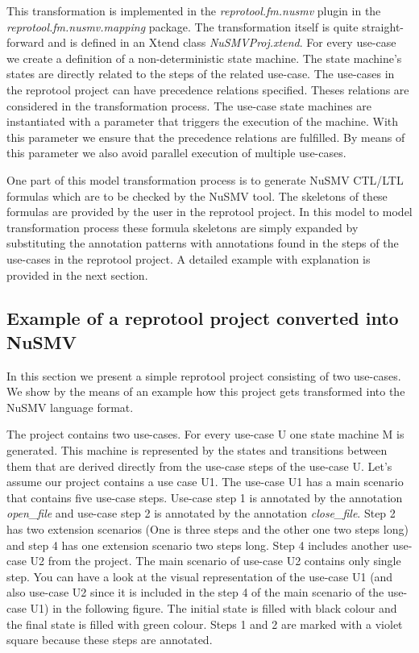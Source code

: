 This transformation is implemented in the \emph{reprotool.fm.nusmv} plugin in the \emph{reprotool.fm.nusmv.mapping} package.
The transformation itself is quite straight-forward and is defined in an Xtend class \emph{NuSMVProj.xtend}.
For every use-case we create a definition of a non-deterministic state machine.
The state machine's states are directly related to the steps of the related use-case.
The use-cases in the reprotool project can have precedence relations specified. Theses relations are considered in the
transformation process. The use-case state machines are instantiated with a parameter that triggers the execution of the machine.
With this parameter we ensure that the precedence relations are fulfilled. By means of this parameter we also avoid parallel execution
of multiple use-cases.

One part of this model transformation process is to generate NuSMV CTL/LTL formulas which are to be checked by the NuSMV tool. The
skeletons of these formulas are provided by the user in the reprotool project. In this model to model transformation process these
formula skeletons are simply expanded by substituting the annotation patterns with annotations found in the steps of the use-cases
in the reprotool project. A detailed example with explanation is provided in the next section.

\subsection{Example of a reprotool project converted into NuSMV}

In this section we present a simple reprotool project consisting of two use-cases. We show by the means of an example how this project
gets transformed into the NuSMV language format.

The project contains two use-cases. For every use-case U one state machine M is generated. This machine is represented by the states and
transitions between them that are derived directly from the use-case steps of the use-case U. Let's assume our project contains a use
case U1. The use-case U1 has a main scenario that contains five use-case steps. Use-case step 1 is annotated by the annotation \emph{open\_file}
and use-case step 2 is annotated by the annotation \emph{close\_file}. Step 2 has two extension scenarios (One is three steps and the other
one two steps long) and step 4 has one extension scenario two steps long. Step 4 includes another use-case U2 from the project. The
main scenario of use-case U2 contains only single step. You can have a look at the visual representation of the use-case U1 (and also
use-case U2 since it is included in the step 4 of the main scenario of the use-case U1) in the following figure. The initial state is
filled with black colour and the final state is filled with green colour. Steps 1 and 2 are marked with a violet square because these
steps are annotated.


